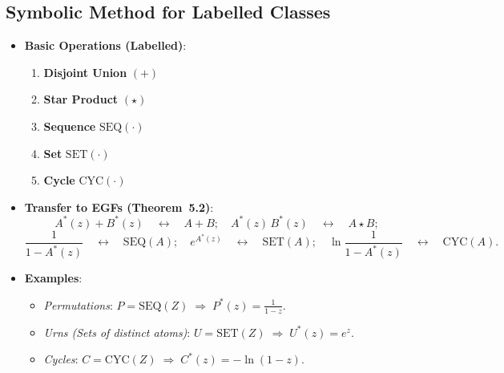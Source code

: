 \documentclass[11pt,letterpaper]{article}
\begin{document}
\subsection{Symbolic Method for Labelled Classes}
\begin{itemize}
  \item \textbf{Basic Operations (Labelled)}:
    \begin{enumerate}
      \item \textbf{Disjoint Union} $(+)$
      \item \textbf{Star Product} $(\star)$
      \item \textbf{Sequence} $\mathrm{SEQ}(\cdot)$
      \item \textbf{Set} $\mathrm{SET}(\cdot)$
      \item \textbf{Cycle} $\mathrm{CYC}(\cdot)$
    \end{enumerate}
  \item \textbf{Transfer to EGFs (Theorem~5.2)}:
    \[
      A^*(z)+B^*(z)\quad\leftrightarrow\quad A + B;\quad
      A^*(z)\,B^*(z)\quad\leftrightarrow\quad A\star B;
    \]
    \[
      \frac{1}{1 - A^*(z)}\quad\leftrightarrow\quad \mathrm{SEQ}(A);\quad
      e^{A^*(z)}\quad\leftrightarrow\quad \mathrm{SET}(A);\quad
      \ln\frac{1}{1-A^*(z)}\quad\leftrightarrow\quad \mathrm{CYC}(A).
    \]
  \item \textbf{Examples}:
    \begin{itemize}
      \item \emph{Permutations}: $P=\mathrm{SEQ}(Z)\;\Longrightarrow\;P^*(z)=\frac{1}{1-z}.$
      \item \emph{Urns (Sets of distinct atoms)}: $U=\mathrm{SET}(Z)\;\Rightarrow\;U^*(z)=e^z.$
      \item \emph{Cycles}: $C=\mathrm{CYC}(Z)\;\Rightarrow\;C^*(z)=-\ln(1-z).$
    \end{itemize}
\end{itemize}

\end{document}
